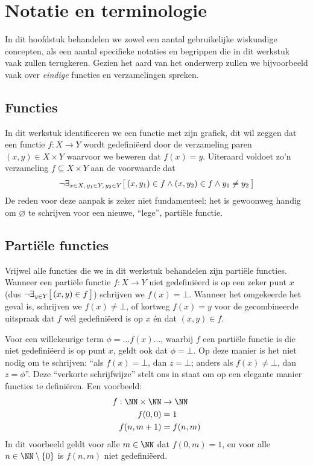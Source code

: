 \chapter{Notatie en terminologie}

In dit hoofdstuk behandelen we zowel een aantal gebruikelijke wiskundige concepten, als een aantal specifieke notaties en begrippen die in dit werkstuk vaak zullen terugkeren. Gezien het aard van het onderwerp zullen we bijvoorbeeld vaak over \emph{eindige} functies en verzamelingen spreken.

\section{Functies}

In dit werkstuk identificeren we een functie met zijn grafiek, dit wil zeggen dat een functie $f : X \to Y$ wordt gedefiniëerd door de verzameling paren $(x, y) \in X \times Y$ waarvoor we beweren dat $f(x) = y$. Uiteraard voldoet zo'n verzameling $f \subseteq X \times Y$ aan de voorwaarde dat
\begin{equation*}
  \neg \exists_{x \in X,\, y_1 \in Y,\, y_2 \in Y} \big[\, (x, y_1) \in f \land (x, y_2) \in f \land y_1 \neq y_2 \,\big]
\end{equation*}
De reden voor deze aanpak is zeker niet fundamenteel: het is gewoonweg handig om $\varnothing$ te schrijven voor een nieuwe, ``lege'', partiële functie.

\section{Partiële functies}

Vrijwel alle functies die we in dit werkstuk behandelen zijn partiële functies. Wanneer een partiële functie $f : X \to Y$ niet gedefiniëerd is op een zeker punt $x$ (dus $\neg \exists_{y \in Y} \big[\, (x, y) \in f \,\big]$) schrijven we $f(x) = \bot$. Wanneer het omgekeerde het geval is, schrijven we $f(x) \neq \bot$, of kortweg $f(x) = y$ voor de gecombineerde uitspraak dat $f$ wél gedefiniëerd is op $x$ én dat $(x, y) \in f$.

Voor een willekeurige term $\phi = \dots f(x)\dots$, waarbij $f$ een partiële functie is die niet gedefiniëerd is op punt $x$, geldt ook dat $\phi = \bot$. Op deze manier is het niet nodig om te schrijven: ``als $f(x) = \bot$, dan $z = \bot$; anders als $f(x) \neq \bot$, dan $z = \phi$''. Deze ``verkorte schrijfwijze'' stelt ons in staat om op een elegante manier functies te definiëren. Een voorbeeld:
\begin{align*}
  f : \NN \times \NN &\to \NN \\
  f(0, 0) &= 1 \\
  f(n, m + 1) &= f(n, m)
\end{align*}
In dit voorbeeld geldt voor alle $m \in \NN$ dat $f(0, m) = 1$, en voor alle $n \in \NN \setminus \{0\}$ is $f(n, m)$ niet gedefiniëerd.

